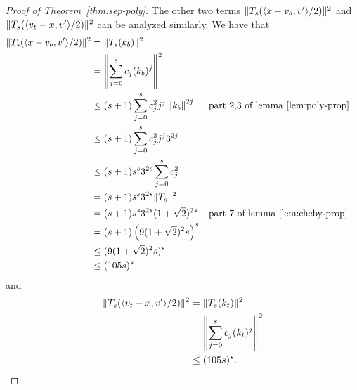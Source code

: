 \begin{proof}[Proof of Theorem~\ref{thm:sep-poly}]
The other two terms $\|T_s(\langle x-v_b,v'\rangle/2)\|^2$ and $\|T_s(\langle v_t-x,v'\rangle/2)\|^2$ can be analyzed similarly.  We have that
\begin{align*}
    \|T_s(\langle x-v_b,v'\rangle/2)\|^2&=\|T_s(k_b)\|^2 \\
    &=\left\|\sum_{j=0}^s c_j(k_b)^j\right\|^2 \\
    &\leq (s+1)\sum_{j=0}^s c_j^2j^j\left\|k_b\right\|^{2j} & &\text{part 2,3 of lemma~\ref{lem:poly-prop}}\\
    &\leq (s+1)\sum_{j=0}^s c_j^2j^j3^{2j} \\
    &\leq (s+1)s^s3^{2s}\sum_{j=0}^s c_j^2 \\
    &=(s+1)s^s3^{2s}\|T_s\|^2 \\
    &=(s+1)s^s3^{2s}(1+\sqrt{2})^{2s} & &\text{part 7 of lemma~\ref{lem:cheby-prop}} \\
    &=(s+1)\left(9(1+\sqrt{2})^2s\right)^s \\
    &\leq (9(1+\sqrt{2})^2s)^s \\
    &\leq (105s)^s
\end{align*}
and
\begin{align*}
    \|T_s(\langle v_t-x,v'\rangle/2)\|^2 &= \|T_s(k_t)\|^2 \\
    &=\left\|\sum_{j=0}^s c_j(k_t)^j\right\|^2 \\
    &\leq (105s)^s.
\end{align*}


\end{proof}
